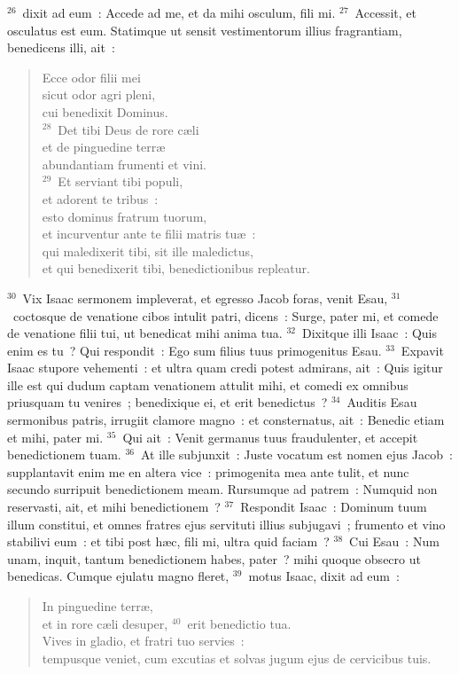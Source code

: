 ${}^{26}$~dixit ad eum~: Accede ad me, et da mihi osculum, fili mi.
${}^{27}$~Accessit, et osculatus est eum. Statimque ut sensit vestimentorum illius fragrantiam, benedicens illi, ait~: \begin{flushleft}\begin{verse}Ecce odor filii mei\\ sicut odor agri pleni,\\ cui benedixit Dominus.\\
${}^{28}$~Det tibi Deus de rore c\ae li\\ et de pinguedine terr\ae \\ abundantiam frumenti et vini.\\
${}^{29}$~Et serviant tibi populi,\\ et adorent te tribus~:\\ esto dominus fratrum tuorum,\\ et incurventur ante te filii matris tu\ae~:\\ qui maledixerit tibi, sit ille maledictus,\\ et qui benedixerit tibi, benedictionibus repleatur.\end{verse}\end{flushleft}


${}^{30}$~Vix Isaac sermonem impleverat, et egresso Jacob foras, venit Esau,
${}^{31}$~coctosque de venatione cibos intulit patri, dicens~: Surge, pater mi, et comede de venatione filii tui, ut benedicat mihi anima tua.
${}^{32}$~Dixitque illi Isaac~: Quis enim es tu~? Qui respondit~: Ego sum filius tuus primogenitus Esau.
${}^{33}$~Expavit Isaac stupore vehementi~: et ultra quam credi potest admirans, ait~: Quis igitur ille est qui dudum captam venationem attulit mihi, et comedi ex omnibus priusquam tu venires~; benedixique ei, et erit benedictus~?
${}^{34}$~Auditis Esau sermonibus patris, irrugiit clamore magno~: et consternatus, ait~: Benedic etiam et mihi, pater mi.
${}^{35}$~Qui ait~: Venit germanus tuus fraudulenter, et accepit benedictionem tuam.
${}^{36}$~At ille subjunxit~: Juste vocatum est nomen ejus Jacob~: supplantavit enim me en altera vice~: primogenita mea ante tulit, et nunc secundo surripuit benedictionem meam. Rursumque ad patrem~: Numquid non reservasti, ait, et mihi benedictionem~?
${}^{37}$~Respondit Isaac~: Dominum tuum illum constitui, et omnes fratres ejus servituti illius subjugavi~; frumento et vino stabilivi eum~: et tibi post h\ae c, fili mi, ultra quid faciam~?
${}^{38}$~Cui Esau~: Num unam, inquit, tantum benedictionem habes, pater~? mihi quoque obsecro ut benedicas. Cumque ejulatu magno fleret,
${}^{39}$~motus Isaac, dixit ad eum~: \begin{flushleft}\begin{verse}In pinguedine terr\ae ,\\ et in rore c\ae li desuper,
${}^{40}$~erit benedictio tua.\\ Vives in gladio, et fratri tuo servies~:\\ tempusque veniet, cum excutias et solvas jugum ejus de cervicibus tuis.\end{verse}\end{flushleft}


